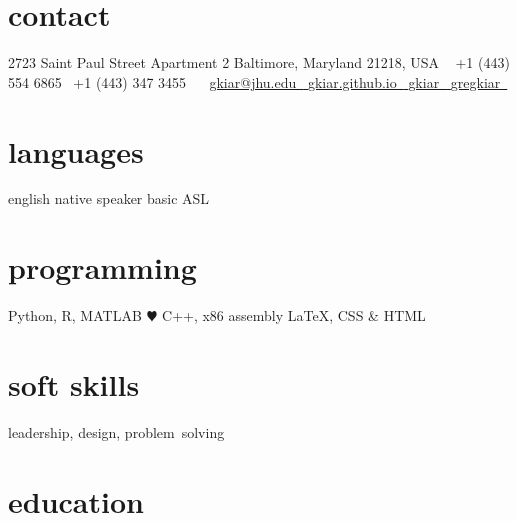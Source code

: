 \documentclass[]{friggeri-cv} %
\begin{document}


\begin{aside} %
\section{contact}
2723 Saint Paul Street
Apartment 2
Baltimore, Maryland
21218, USA
~
+1 (443) 554 6865~{\color{green} \faMobilePhone}
+1 (443) 347 3455~{\color{green} \faMobilePhone}
~
\href{mailto:gkiar@jhu.edu}{gkiar@jhu.edu~{\color{red} \faEnvelope}}
\href{http://gkiar.github.io}{gkiar.github.io~{\color{brown} \faGlobe}}
\href{http://github.com/gkiar}{gkiar~{\color{purple} \faGithub}}
\href{https://www.linkedin.com/in/gregkiar}{gregkiar~{\color{blue} \faLinkedin}}
\section{languages}
english native speaker
basic ASL
\section{programming}
Python, R, MATLAB {\color{red} $\varheartsuit$}
C++, x86 assembly
LaTeX, CSS \& HTML
\section{soft skills}
leadership, design, problem~solving
\end{aside}


\section{education}
\end{document}
